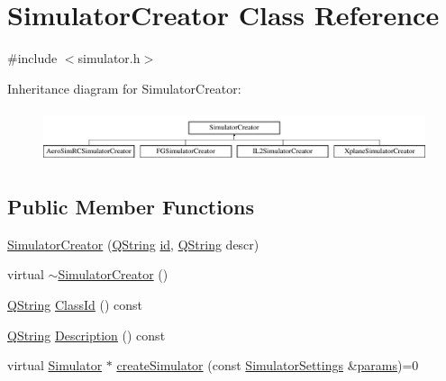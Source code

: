 \hypertarget{class_simulator_creator}{\section{Simulator\-Creator Class Reference}
\label{class_simulator_creator}
}


{\ttfamily \#include $<$simulator.\-h$>$}

Inheritance diagram for Simulator\-Creator\-:\begin{figure}[H]
\begin{center}
\leavevmode
\includegraphics[height=1.555556cm]{class_simulator_creator}
\end{center}
\end{figure}
\subsection*{Public Member Functions}
\begin{DoxyCompactItemize}
\item 
\hyperlink{group___h_i_t_l_plugin_gad78ac7b6a64456e259fcb9aba94f4947}{Simulator\-Creator} (\hyperlink{group___u_a_v_objects_plugin_gab9d252f49c333c94a72f97ce3105a32d}{Q\-String} \hyperlink{glext_8h_a58c2a664503e14ffb8f21012aabff3e9}{id}, \hyperlink{group___u_a_v_objects_plugin_gab9d252f49c333c94a72f97ce3105a32d}{Q\-String} descr)
\item 
virtual \hyperlink{group___h_i_t_l_plugin_ga07d44da289771bf1bc8cf9dd01d5cb13}{$\sim$\-Simulator\-Creator} ()
\item 
\hyperlink{group___u_a_v_objects_plugin_gab9d252f49c333c94a72f97ce3105a32d}{Q\-String} \hyperlink{group___h_i_t_l_plugin_ga4195682a513bc0ddf6818ff4058d2619}{Class\-Id} () const 
\item 
\hyperlink{group___u_a_v_objects_plugin_gab9d252f49c333c94a72f97ce3105a32d}{Q\-String} \hyperlink{group___h_i_t_l_plugin_ga1ace675dc4a400f644b7e6f7506f65e9}{Description} () const 
\item 
virtual \hyperlink{class_simulator}{Simulator} $\ast$ \hyperlink{group___h_i_t_l_plugin_ga2511a02773cadaf9c503a89172622837}{create\-Simulator} (const \hyperlink{group___h_i_t_l_plugin_ga052199f1328d3002bce3e45345aa7f4e}{Simulator\-Settings} \&\hyperlink{glext_8h_afeb6390ab3bc8a0e96a88aff34d52288}{params})=0
\end{DoxyCompactItemize}


